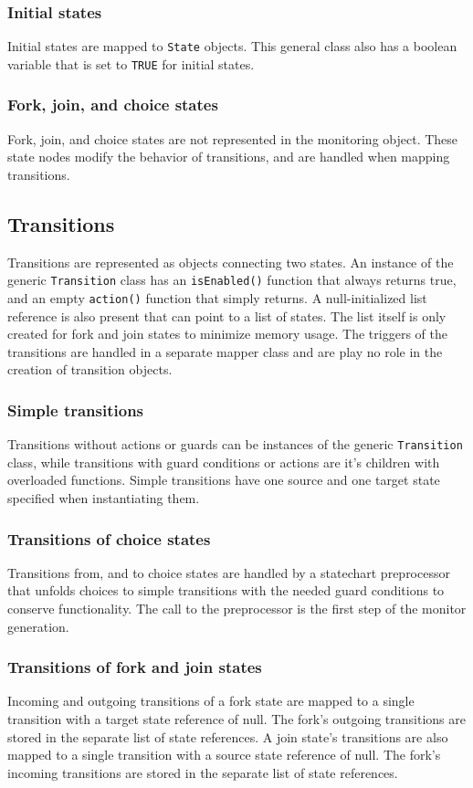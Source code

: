    \subsubsection{Initial states}
Initial states are mapped to \verb!State! objects. This general class also has a boolean variable that is set to \verb!TRUE! for initial states.
    \subsubsection{Fork, join, and choice states}
Fork, join, and choice states are not represented in the monitoring object. These state nodes modify the behavior of transitions, and are handled when mapping transitions.
  \subsection{Transitions}
Transitions are represented as objects connecting two states. An instance of the generic \verb!Transition! class has an \verb!isEnabled()! function that always returns true, and an empty \verb!action()! function that simply returns. A null-initialized list reference is also present that can point to a list of states. The list itself is only created for fork and join states to minimize memory usage. The triggers of the transitions are handled in a separate mapper class and are play no role in the creation of transition objects.
    \subsubsection{Simple transitions}
Transitions without actions or guards can be instances of the generic \verb!Transition! class, while transitions with guard conditions or actions are it's children with overloaded functions. Simple transitions have one source and one target state specified when instantiating them.
    \subsubsection{Transitions of choice states}
Transitions from, and to choice states are handled by a statechart preprocessor that unfolds choices to simple transitions with the needed guard conditions to conserve functionality. The call to the preprocessor is the first step of the monitor generation.
    \subsubsection{Transitions of fork and join states}
Incoming and outgoing transitions of a fork state are mapped to a single transition with a target state reference of null. The fork's outgoing transitions are stored in the separate list of state references. A join state's transitions are also mapped to a single transition with a source state reference of null. The fork's incoming transitions are stored in the separate list of state references.
